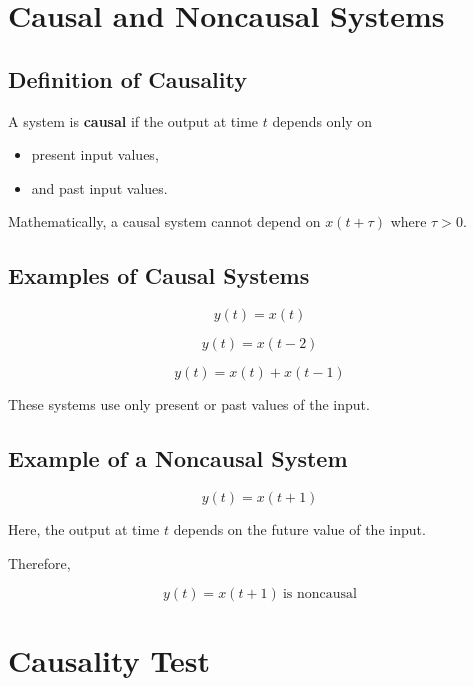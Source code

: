 \section{Causal and Noncausal Systems}


\subsection{Definition of Causality}

A system is \textbf{causal} if the output at time \(t\) depends only on

\begin{itemize}
\item present input values,
\item and past input values.
\end{itemize}

Mathematically, a causal system cannot depend on \(x(t+\tau)\) where
\(\tau>0\).


\subsection{Examples of Causal Systems}

\[
y(t)=x(t)
\]

\[
y(t)=x(t-2)
\]

\[
y(t)=x(t)+x(t-1)
\]

These systems use only present or past values of the input.


\subsection{Example of a Noncausal System}

\[
y(t)=x(t+1)
\]

Here, the output at time \(t\) depends on the future value of the input.

Therefore,

\[
\boxed{
y(t)=x(t+1)\ \text{is noncausal}
}
\]


\section{Causality Test}

